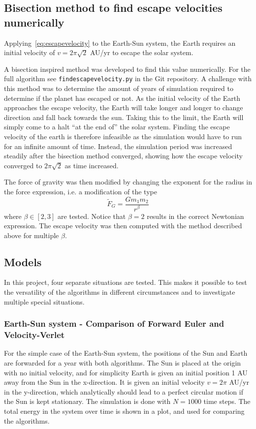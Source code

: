 \documentclass[aps,reprint]{revtex4-1}
\begin{document}
\subsection{Bisection method to find escape velocities numerically}
Applying~\eqref{eq:escapevelocity} to the Earth-Sun system, the Earth requires an initial velocity of
$v = 2 \pi \sqrt{2}$ AU/yr to escape the solar system.

A bisection inspired method was developed to find this value numerically. For the
full algorithm see \texttt{findescapevelocity.py} in the Git repository. A challenge
with this method was to determine the amount of years of simulation required to
determine if the planet has escaped or not. As the initial velocity of the Earth
approaches the escape velocity, the Earth will take longer and longer to change
direction and fall back towards the sun. Taking this to the limit, the Earth will
simply come to a halt ``at the end of'' the solar system. Finding the escape
velocity of the earth is therefore infeasible as the simulation would have to
run for an infinite amount of time. Instead, the simulation period was increased
steadily after the bisection method converged, showing how the escape velocity
converged to \(2\pi\sqrt{2}\) as time increased.

The force of gravity was then modified by changing the exponent for the radius
in the force expression, i.e. a modification of the type
\begin{equation}
  \label{eq:duckling}
  \tilde{F}_G = \frac{G m_1 m_2}{r^\beta}
\end{equation}
where $\beta \in [2,3]$ are tested. Notice that $\beta = 2$ results in the correct
Newtonian expression. The escape velocity was then computed with the method
described above for multiple $\beta$.

\subsection{Models}
In this project, four separate situations are tested. This makes it possible to test the versatility of the
algorithms in different circumstances and to investigate multiple special situations.
\subsubsection{Earth-Sun system - Comparison of Forward Euler and Velocity-Verlet}
\label{seq:earthsunmethod}
For the simple case of the Earth-Sun system, the positions of the Sun and Earth are
forwarded for a year with both algorithms. The Sun is placed at the origin with
no initial velocity, and for simplicity Earth is given an initial position 1 AU
away from the Sun in the x-direction. It is given an initial velocity $v = 2\pi$ AU/yr
in the y-direction, which analytically should lead to a perfect circular motion
if the Sun is kept stationary. The simulation is done with $N = 1000$ time steps.
The total energy in the system over time is shown in a plot, and used for
comparing the algorithms.
\end{document}
